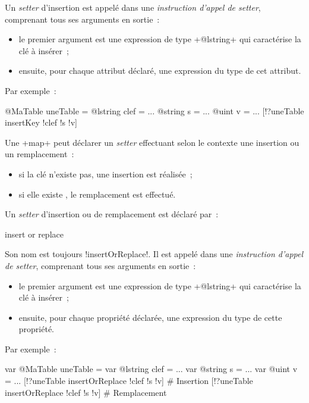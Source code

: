 Un \emph{setter} d'insertion est appelé dans une \emph{instruction d'appel de setter}, comprenant tous ses arguments en sortie~:
\begin{itemize}
  \item le premier argument est une expression de type \ggst+@lstring+ qui caractérise la clé à insérer~;
  \item ensuite, pour chaque attribut déclaré, une expression du type de cet attribut.
\end{itemize}

Par exemple~:
\begin{galgas3}
@MaTable uneTable = {}
@lstring clef = ...
@string s = ...
@uint v = ...
[!?uneTable insertKey !clef !s !v]
\end{galgas3}




Une \ggsq+map+ peut déclarer un \emph{setter} effectuant selon le contexte une insertion ou un remplacement~:
\begin{itemize}
  \item si la clé n'existe pas, une insertion est réalisée~;
  \item si elle existe , le remplacement est effectué.
\end{itemize}

Un \emph{setter} d'insertion ou de remplacement est déclaré par~:

\begin{galgas3}
insert or replace
\end{galgas3}

\begin{galgas4}
\end{galgas4}

Son nom est toujours \ggsq!insertOrReplace!. Il est appelé dans une \emph{instruction d'appel de setter}, comprenant tous ses arguments en sortie~:
\begin{itemize}
  \item le premier argument est une expression de type \ggsq+@lstring+ qui caractérise la clé à insérer~;
  \item ensuite, pour chaque propriété déclarée, une expression du type de cette propriété.
\end{itemize}

Par exemple~:
\begin{galgas3}
var @MaTable uneTable = {}
var @lstring clef = ...
var @string s = ...
var @uint v = ...
[!?uneTable insertOrReplace !clef !s !v] # Insertion
[!?uneTable insertOrReplace !clef !s !v] # Remplacement
\end{galgas3}








